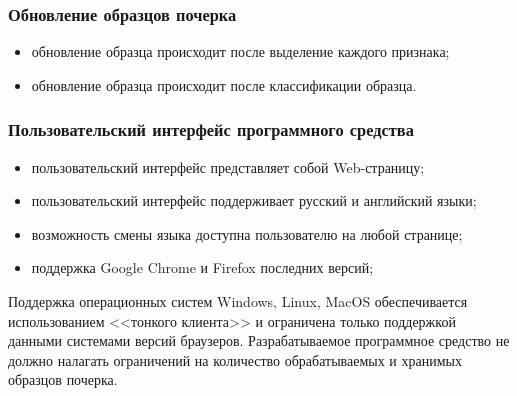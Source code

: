 \subsubsection{Обновление образцов почерка}
\label{sec:freq:update}
\begin{itemize}
	\item обновление образца происходит после выделение каждого признака;
	\item обновление образца происходит после классификации образца.
\end{itemize}

\subsubsection{Пользовательский интерфейс программного средства}
\begin{itemize}
	\item пользовательский интерфейс представляет собой Web-страницу;
	\item пользовательский интерфейс поддерживает русский и английский \mbox{языки;}
	\item возможность смены языка доступна пользователю на любой \mbox{странице;}
	\item поддержка Google Chrome и Firefox последних версий;
\end{itemize}

Поддержка операционных систем Windows, Linux, MacOS обеспечивается использованием <<тонкого клиента>> и ограничена только поддержкой данными системами версий браузеров.
Разрабатываемое программное средство не должно налагать ограничений на количество обрабатываемых и хранимых образцов почерка.